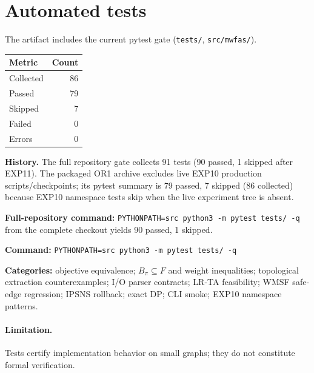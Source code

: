 \section{Automated tests}
\label{sec:or1-tests}

The artifact includes the current pytest gate (\texttt{tests/}, \texttt{src/mwfas/}).

\begin{center}
\begin{tabular}{lr}
\toprule
Metric & Count \\
\midrule
Collected & 86 \\
Passed & 79 \\
Skipped & 7 \\
Failed & 0 \\
Errors & 0 \\
\bottomrule
\end{tabular}
\end{center}

\textbf{History.} The full repository gate collects 91 tests (90 passed, 1 skipped after EXP11). The packaged OR1 archive excludes live EXP10 production scripts/checkpoints; its pytest summary is 79 passed, 7 skipped (86 collected) because EXP10 namespace tests skip when the live experiment tree is absent.

\textbf{Full-repository command:} \texttt{PYTHONPATH=src python3 -m pytest tests/ -q} from the complete checkout yields 90 passed, 1 skipped.

\textbf{Command:} \texttt{PYTHONPATH=src python3 -m pytest tests/ -q}

\textbf{Categories:} objective equivalence; $B_\pi\subseteq F$ and weight inequalities; topological extraction counterexamples; I/O parser contracts; LR-TA feasibility; WMSF safe-edge regression; IPSNS rollback; exact DP; CLI smoke; EXP10 namespace patterns.

\paragraph{Limitation.} Tests certify implementation behavior on small graphs; they do not constitute formal verification.
